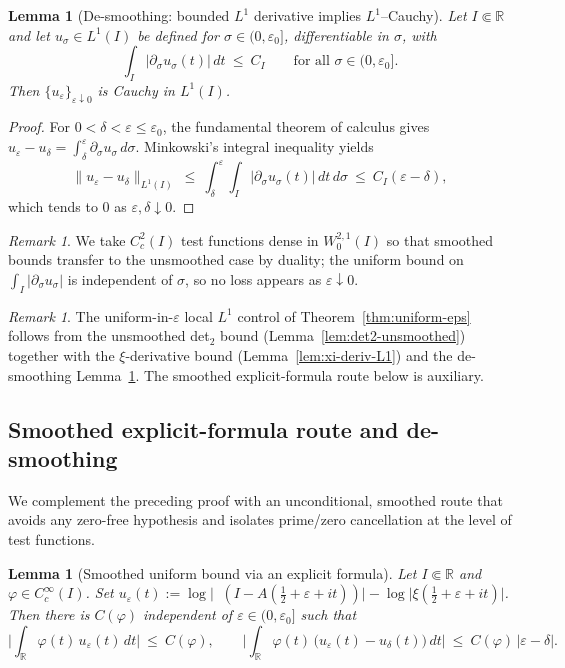 \documentclass[11pt]{article}
\newtheorem{lemma}[theorem]{Lemma}
\theoremstyle{definition}
\theoremstyle{remark}
\newtheorem{remark}[theorem]{Remark}
\newcommand{\R}{\mathbb{R}}
\DeclareMathOperator{\dettwo}{det_2}
\begin{document}
\begin{lemma}[De-smoothing: bounded $L^1$ derivative implies $L^1$–Cauchy]\label{lem:desmoothing}
Let \(I\Subset\R\) and let \(u_\sigma\in L^1(I)\) be defined for \(\sigma\in(0,\varepsilon_0]\), differentiable in \(\sigma\), with
\[
  \int_I |\partial_\sigma u_\sigma(t)|\,dt\ \le\ C_I\qquad\text{for all }\sigma\in(0,\varepsilon_0].
\]
Then \(\{u_\varepsilon\}_{\varepsilon\downarrow 0}\) is Cauchy in $L^1(I)$.
\end{lemma}
\begin{proof}
For \(0<\delta<\varepsilon\le\varepsilon_0\), the fundamental theorem of calculus gives
\(u_\varepsilon-u_\delta=\int_\delta^\varepsilon \partial_\sigma u_\sigma\,d\sigma\).
Minkowski's integral inequality yields
\[
  \|u_\varepsilon-u_\delta\|_{L^1(I)}\ \le\ \int_\delta^\varepsilon \int_I |\partial_\sigma u_\sigma(t)|\,dt\,d\sigma\ \le\ C_I(\varepsilon-\delta),
\]
which tends to $0$ as \(\varepsilon,\delta\downarrow 0\).
\end{proof}
\begin{remark}
We take \(C_c^2(I)\) test functions dense in \(W^{2,1}_0(I)\) so that smoothed bounds transfer to the unsmoothed case by duality; the uniform bound on \(\int_I|\partial_\sigma u_\sigma|\) is independent of \(\sigma\), so no loss appears as \(\varepsilon\downarrow 0\).
\end{remark}
\begin{remark}
The uniform-in-\(\varepsilon\) local $L^1$ control of Theorem~\ref{thm:uniform-eps} follows from the unsmoothed det$_2$ bound (Lemma~\ref{lem:det2-unsmoothed}) together with the \(\xi\)-derivative bound (Lemma~\ref{lem:xi-deriv-L1}) and the de-smoothing Lemma~\ref{lem:desmoothing}. The smoothed explicit-formula route below is auxiliary.
\end{remark}
\subsection{Smoothed explicit-formula route and de-smoothing}\label{subsec:smoothed-explicit}
We complement the preceding proof with an unconditional, smoothed route that avoids any zero-free hypothesis and isolates prime/zero cancellation at the level of test functions.

\begin{lemma}[Smoothed uniform bound via an explicit formula]\label{lem:smoothed-explicit}
Let \(I\Subset\R\) and \(\varphi\in C_c^{\infty}(I)\). Set \(u_\varepsilon(t):=\log\big|\dettwo(I-A(\tfrac12+\varepsilon+it))\big|-\log\big|\xi(\tfrac12+\varepsilon+it)\big|\). Then there is \(C(\varphi)\) independent of \(\varepsilon\in(0,\varepsilon_0]\) such that
\[
 \Big|\int_{\R} \varphi(t)\,u_\varepsilon(t)\,dt\Big|\ \le\ C(\varphi),\qquad \Big|\int_{\R} \varphi(t)\,\big(u_\varepsilon(t)-u_\delta(t)\big)\,dt\Big|\ \le\ C(\varphi)\,|\varepsilon-\delta|.
\]
\end{lemma}
\end{document}
